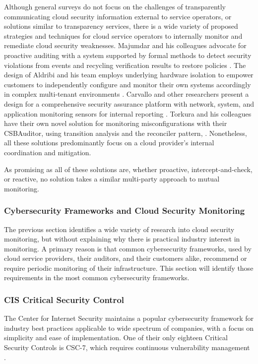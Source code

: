 \documentclass{jdf}
\begin{document}
Although general surveys do not focus on the challenges of transparently communicating cloud security information external to service operators, or solutions similar to transparency services, there is a wide variety of proposed strategies and techniques for cloud service operators to internally monitor and remediate cloud security weaknesses. Majumdar and his colleagues advocate for proactive auditing with a system supported by formal methods to detect security violations from events and recycling verification results to restore policies \citeyear[p.~2518]{majumdar22}. The design of Aldribi and his team employs underlying hardware isolation to empower customers to independently configure and monitor their own systems accordingly in complex multi-tenant environments \citeyear{aldribi15}. Carvallo and other researchers present a design for a comprehensive security assurance platform with network, system, and application monitoring sensors for internal reporting \citeyear{carvallo17}. Torkura and his colleagues have their own novel solution for monitoring misconfigurations with their CSBAuditor, using transition analysis and the reconciler pattern, \citeyear{torkura21}. Nonetheless, all these solutions predominantly focus on a cloud provider's internal coordination and mitigation.

As promising as all of these solutions are, whether proactive, intercept-and-check, or reactive, no solution takes a similar multi-party approach to mutual monitoring.

\subsubsection{Cybersecurity Frameworks and Cloud Security Monitoring}

The previous section identifies a wide variety of research into cloud security monitoring, but without explaining why there is practical industry interest in monitoring. A primary reason is that common cybersecurity frameworks, used by cloud service providers, their auditors, and their customers alike, recommend or require periodic monitoring of their infrastructure. This section will identify those requirements in the most common cybersecurity frameworks.

\subsubsection{CIS Critical Security Control}

The Center for Internet Security maintains a popular cybersecurity framework for industry best practices applicable to wide spectrum of companies, with a focus on simplicity and ease of implementation. One of their only eighteen Critical Security Controls is CSC-7, which requires continuous vulnerability management \citeyear{csc18}.
\end{document}
